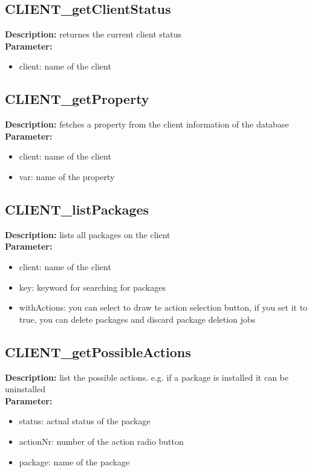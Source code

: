 \subsection{CLIENT\_getClientStatus}
\textbf{Description:} returnes the current client status\\
\textbf{Parameter:}
\begin{itemize}
\item client: name of the client
\end{itemize}

\subsection{CLIENT\_getProperty}
\textbf{Description:} fetches a property from the client information of the database\\
\textbf{Parameter:}
\begin{itemize}
\item client: name of the client
\item var: name of the property
\end{itemize}

\subsection{CLIENT\_listPackages}
\textbf{Description:} lists all packages on the client\\
\textbf{Parameter:}
\begin{itemize}
\item client: name of the client
\item key: keyword for searching for packages
\item withActions: you can select to draw te action selection button, if you set it to true, you can delete packages and discard package deletion jobs
\end{itemize}

\subsection{CLIENT\_getPossibleActions}
\textbf{Description:} list the possible actions. e.g. if a package is installed it can be uninstalled\\
\textbf{Parameter:}
\begin{itemize}
\item status: actual status of the package
\item actionNr: number of the action radio button
\item package: name of the package
\end{itemize}

